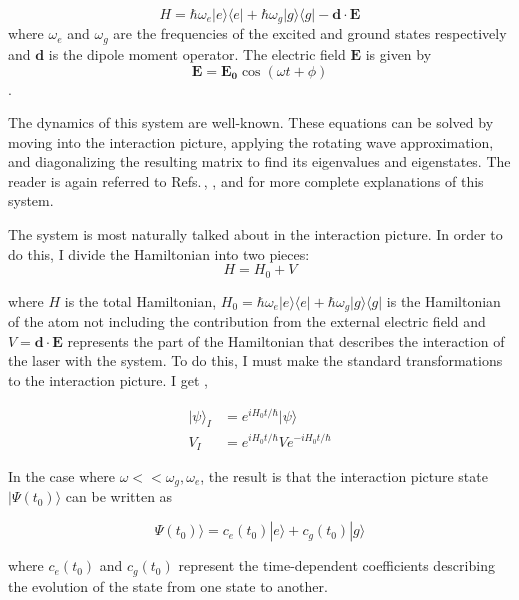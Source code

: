 \begin{equation}
H = \hbar \omega_e |e\rangle\langle e| + \hbar \omega_g |g\rangle\langle g| - \mathbf{d}\cdot\mathbf{E}
\end{equation}  
where $\omega_e$ and $\omega_g$ are the frequencies of the excited and ground states respectively and $\mathbf{d}$ is the dipole moment operator. The electric field $\mathbf{E}$ is given by 
\begin{equation}
\mathbf{E} = \mathbf{E_0} \cos (\omega t + \phi)
\end{equation}
\cite{Young1997363}. 

The dynamics of this system are well-known. These equations can be solved by moving into the interaction picture, applying the rotating wave approximation, and diagonalizing the resulting matrix to find its eigenvalues and eigenstates. The reader is again referred to Refs.\,\cite{cohenTannoudji}, \cite{demilleBudkerKimball}, and \cite{Young1997363} for more complete explanations of this system. 

The system is most naturally talked about in the interaction picture. In order to do this, I divide the Hamiltonian into two pieces: 
\begin{equation}
H=H_0+V
\end{equation} 

where $H$ is the total Hamiltonian, $H_0=\hbar \omega_e |e\rangle\langle e| + \hbar \omega_g|g\rangle\langle g|$ is the Hamiltonian of the atom not including the contribution from the external electric field and $V=\mathbf{d}\cdot\mathbf{E}$ represents the part of the Hamiltonian that describes the interaction of the laser with the system. To do this, I must make the standard transformations to the interaction picture. I get \cite{merzbacher} \cite{sakurai}, 

\begin{align}
|\psi\rangle_I &= e^{i H_0 t/\hbar} |\psi \rangle \\
V_I &= e^{i H_0 t/\hbar} V e^{-i H_0 t/\hbar}
\end{align}

In the case where $\omega<<\omega_g,\omega_e$, the result is that the interaction picture state $|\Psi (t_0)\rangle$ can be written as 

\begin{equation}
\Psi (t_0)\rangle = c_e(t_0) |e\rangle + c_g(t_0) |g\rangle
\end{equation}

where $c_e(t_0)$ and $c_g(t_0)$ represent the time-dependent coefficients describing the evolution of the state from one state to another. 

